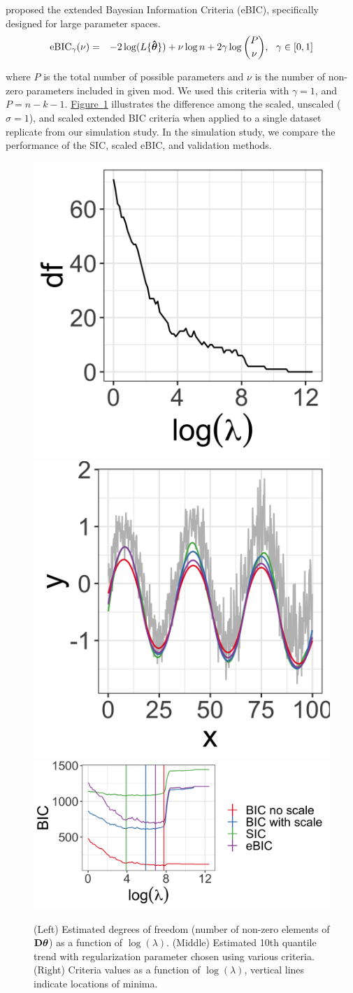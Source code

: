 \documentclass[12pt]{article}
\newcommand{\Fig}[1]{\hyperref[fig:#1]{Figure~\ref*{fig:#1}}} %
\newcommand{\Fig}[1]{{Figure~\ref{fig:#1}}} %
\newcommand{\V}[1]{{\bm{\mathbf{\MakeLowercase{#1}}}}} %
\newcommand{\Vhat}[1]{{\bm{\hat \mathbf{\MakeLowercase{#1}}}}} %
\newcommand{\M}[1]{{\bm{\mathbf{\MakeUppercase{#1}}}}} %
\begin{document}
	\cite{chen2008} proposed the extended Bayesian Information Criteria (eBIC), specifically designed for large parameter spaces.
	\begin{eqnarray*}
	\label{eq:eBIC}
	\mbox{eBIC}_{\gamma}(\nu) & = & -2\log(L\{\Vhat{\theta}\}) + \nu\log n  + 2\gamma\log{P \choose \nu},~~\gamma \in [0,1]
	\end{eqnarray*}

	where $P$ is the total number of possible parameters and $\nu$ is the number of non-zero parameters included in given mod. We used this criteria with $\gamma = 1$, and $P=n-k-1$. \Fig{BIC} illustrates the difference among the scaled, unscaled ($\sigma = 1$), and scaled extended BIC criteria
	when applied to a single dataset replicate from our simulation study. In the simulation study, we compare the performance of the SIC, scaled eBIC, and validation methods. 
	
	\begin{figure}[h!]
		\includegraphics[width = 0.25\linewidth]{Figures/df_by_lambda.png}
		\includegraphics[width = 0.25\linewidth]{Figures/BIC_data.png}
		\includegraphics[width = 0.5\linewidth]{Figures/BIC_by_lambda.png}
		\caption{(Left) Estimated degrees of freedom (number of non-zero elements of $\M{D}\V{\theta}$) as a function of $\log(\lambda)$. (Middle) Estimated 10th quantile trend with regularization parameter chosen using various criteria. (Right) Criteria values as a function of $\log(\lambda)$, vertical lines indicate locations of minima.}
		\label{fig:BIC}
	\end{figure}
\end{document}
